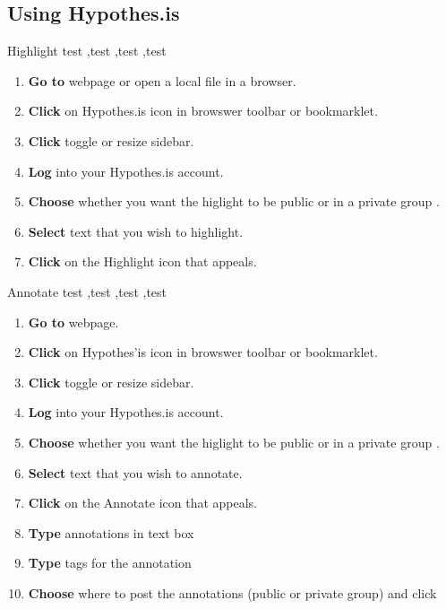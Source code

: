 \documentclass[10pt,a4paper]{article}
\begin{document}
\subsection{Using Hypothes.is}

\begin{textbox}{Highlight}
test  \sep test \sep test \sep test

\bigskip

\begin{enumerate}
\item \textbf{Go to} webpage or open a local file in a browser. 
\item \textbf{Click} on Hypothes.is icon in browswer toolbar or bookmarklet.
\item \textbf{Click} toggle or resize sidebar.
\item \textbf{Log} into your Hypothes.is account.
\item \textbf{Choose} whether you want the higlight to be public or in a private group .
\item \textbf{Select} text that you wish to highlight.
\item \textbf{Click} on the Highlight icon that appeals.

\end{enumerate}

\end{textbox}

\begin{textbox}{Annotate}
test  \sep test \sep test \sep test

\bigskip

\begin{enumerate}
\item \textbf{Go to} webpage. 
\item \textbf{Click} on Hypothes'is icon in browswer toolbar or bookmarklet.
\item \textbf{Click} toggle or resize sidebar.
\item \textbf{Log} into your Hypothes.is account.
\item \textbf{Choose} whether you want the higlight to be public or in a private group .
\item \textbf{Select} text that you wish to annotate.
\item \textbf{Click} on the Annotate icon that appeals.
\item \textbf{Type} annotations in text box
\item \textbf{Type} tags for the annotation
\item \textbf{Choose} where to post the annotations (public or private group) and click 

\end{enumerate}

\end{textbox}
\end{document}
